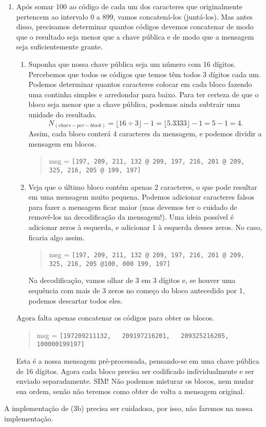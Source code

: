 \documentclass[12pt,a4paper]{article}
\begin{document}
\begin{enumerate}
\item Após somar 100 ao código de cada um dos caracteres que originalmente pertencem ao intervalo $0$ a $899$, vamos concatená-los (juntá-los). Mas antes disso, precisamos determinar quantos códigos devemos concatenar de modo que o resultado seja menor que a chave pública e de modo que a mensagem seja suficientemente grante.
\begin{enumerate}
\item Suponha que nossa chave pública seja um número com 16 dígitos. Percebemos que todos os códigos que temos têm todos 3 dígitos cada um. Podemos determinar quantos caracteres colocar em cada bloco fazendo uma continha simples e arredondar para baixo. Para ter certeza de que o bloco seja menor que a chave pública, podemos ainda subtrair uma unidade do resultado.
\[
N_{(chars-per-block)} = \lfloor 16\div 3\rfloor -1 = \lfloor 5.3333\rfloor -1 = 5 - 1 = 4.
\]
Assim, cada bloco conterá 4 caracteres da mensagem, e podemos dividir a mensagem em blocos.
\begin{quote}
msg = {\color{red}\verb=[197, 209, 211, 132 @ 209, 197, 216, 201 @ 209, 325, 216, 205 @ 199, 197]=}
\end{quote}
\item Veja que o último bloco contém apenas 2 caracteres, o que pode resultar em uma mensagem muito pequena. Podemos adicionar caracteres falsos para fazer a mensagem ficar maior (mas devemos ter o cuidado de removê-los na decodificação da mensagem!). Uma ideia possível é adicionar zeros à esquerda, e adicionar 1 à esquerda desses zeros. No caso, ficaria algo assim.
\begin{quote}
msg = {\color{red}\verb|[197, 209, 211, 132 @ 209, 197, 216, 201 @ 209, 325, 216, 205 @|}{\color{cyan}\verb|100, 000|}{\color{red}\verb| 199, 197]|}
\end{quote}
Na decodificação, vamos olhar de 3 em 3 dígitos e, se houver uma sequência com mais de 3 zeros no começo do bloco antecedido por 1, podemos descartar todos eles.
\end{enumerate}
Agora falta apenas concatenar os códigos para obter os blocos.
\begin{quote}
msg = {\color{red}\verb|[197209211132,   209197216201,   209325216205,   100000199197]|}
\end{quote}
Esta é a nossa mensagem pré-processada, pensando-se em uma chave pública de 16 dígitos. Agora cada bloco precisa ser codificado individualmente e ser enviado separadamente. SIM! Não podemos misturar os blocos, nem mudar sua ordem, senão não teremos como obter de volta a mensagem original.
\end{enumerate}



A implementação de (3b) precisa ser cuidadosa, por isso, não faremos na nossa implementação.





\newpage

\end{document}
